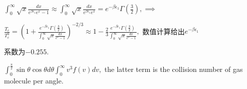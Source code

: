 \documentclass{ctexart}
\begin{document}
$\int_{0}^{\infty }\sqrt{x}\frac{dx}{e^{\beta \epsilon _{1}}e^{x}-1}\approx
\int_{0}^{\infty }\sqrt{x}\frac{dx}{e^{\beta \epsilon _{1}}e^{x}}=e^{-\beta
\epsilon _{1}}\Gamma \left( \frac{3}{2}\right) ,\implies $

$\frac{T_{c}}{T_{c}^{0}}=\left( 1+\frac{e^{-\beta \epsilon _{1}}\Gamma
\left( \frac{3}{2}\right) }{\int_{0}^{\infty }\sqrt{x}\frac{dx}{e^{x}-1}}%
\right) ^{-2/3}\approx 1-\frac{2}{3}\frac{e^{-\beta \epsilon _{1}}\Gamma
\left( \frac{3}{2}\right) }{\int_{0}^{\infty }\sqrt{x}\frac{dx}{e^{x}-1}},$%
数值计算给出$e^{-\beta \epsilon _{1}}$

系数为$-0.255.$\qquad 

$\int_{0}^{\frac{\pi }{2}}\sin \theta \cos \theta d\theta \int_{0}^{\infty
}v^{3}f\left( v\right) dv,$ the latter term is the collision number of gas
molecule per angle.
\end{document}
